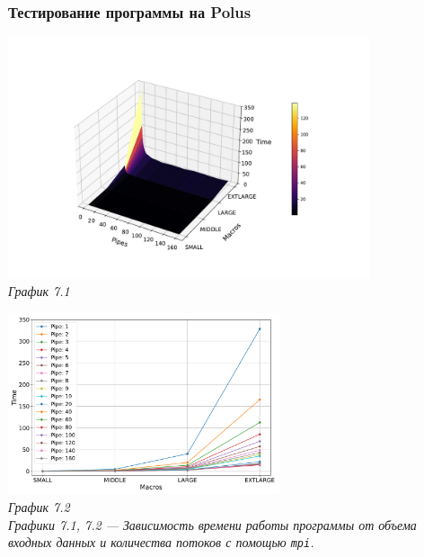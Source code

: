 \documentclass[a4paper, 11pt]{article}
\begin{document}
\subsubsection*{Тестирование программы на Polus}
\begin{center}
    \includegraphics[width=0.8\textwidth]{../graph/mpi.pdf} \\
    \small \it
    График 7.1
\end{center}

\begin{center}
    \includegraphics[width=0.6\textwidth]{../graph/mpi1.pdf} \\
    \small \it
    График 7.2\\ Графики 7.1, 7.2 --- Зависимость времени работы программы от объема входных данных и количества потоков с помощью \texttt{mpi}.
\end{center}
\end{document}
